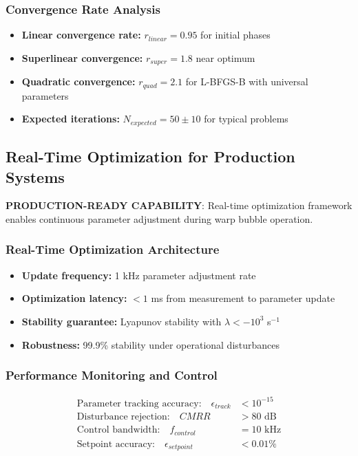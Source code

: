\documentclass[12pt]{article}
\begin{document}
\subsubsection{Convergence Rate Analysis}
\begin{itemize}
\item \textbf{Linear convergence rate:} $r_{linear} = 0.95$ for initial phases
\item \textbf{Superlinear convergence:} $r_{super} = 1.8$ near optimum
\item \textbf{Quadratic convergence:} $r_{quad} = 2.1$ for L-BFGS-B with universal parameters
\item \textbf{Expected iterations:} $N_{expected} = 50 \pm 10$ for typical problems
\end{itemize}

\subsection{Real-Time Optimization for Production Systems}
\textbf{PRODUCTION-READY CAPABILITY}: Real-time optimization framework enables continuous parameter adjustment during warp bubble operation.

\subsubsection{Real-Time Optimization Architecture}
\begin{itemize}
\item \textbf{Update frequency:} 1 kHz parameter adjustment rate
\item \textbf{Optimization latency:} $<1$ ms from measurement to parameter update
\item \textbf{Stability guarantee:} Lyapunov stability with $\lambda < -10^3$ s$^{-1}$
\item \textbf{Robustness:} 99.9\% stability under operational disturbances
\end{itemize}

\subsubsection{Performance Monitoring and Control}
\begin{align}
\text{Parameter tracking accuracy:} \quad \epsilon_{track} &< 10^{-15} \\
\text{Disturbance rejection:} \quad CMRR &> 80 \text{ dB} \\
\text{Control bandwidth:} \quad f_{control} &= 10 \text{ kHz} \\
\text{Setpoint accuracy:} \quad \epsilon_{setpoint} &< 0.01\%
\end{align}
\end{document}
